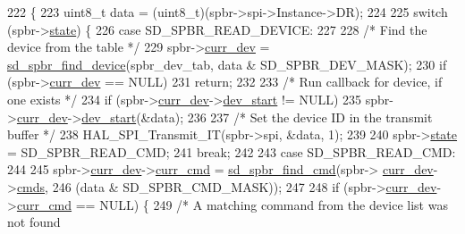 \begin{DoxyCode}
222 \{
223     uint8\_t data = (uint8\_t)(spbr->spi->Instance->DR);
224 
225     \textcolor{keywordflow}{switch} (spbr->\mbox{\hyperlink{structsd__spbr_a15ddc1ec640d62f5f08410710d83de8a}{state}}) \{
226     \textcolor{keywordflow}{case} SD\_SPBR\_READ\_DEVICE:
227     
228         \textcolor{comment}{/* Find the device from the table */}
229         spbr->\mbox{\hyperlink{structsd__spbr_ab3464a17b25faba49ad79ea9c48ea46f}{curr\_dev}} = \mbox{\hyperlink{group___s_d___s_p_i___bridge_gaf2de23902fa458c64da619f83a31d7ec}{sd\_spbr\_find\_device}}(spbr\_dev\_tab, data & 
      SD\_SPBR\_DEV\_MASK);
230         \textcolor{keywordflow}{if} (spbr->\mbox{\hyperlink{structsd__spbr_ab3464a17b25faba49ad79ea9c48ea46f}{curr\_dev}} == NULL)
231             \textcolor{keywordflow}{return};
232             
233         \textcolor{comment}{/* Run callback for device, if one exists */}
234         \textcolor{keywordflow}{if} (spbr->\mbox{\hyperlink{structsd__spbr_ab3464a17b25faba49ad79ea9c48ea46f}{curr\_dev}}->\mbox{\hyperlink{structsd__spbr__dev_a3e035473248af7cdffca805f540617c8}{dev\_start}} != NULL)
235             spbr->\mbox{\hyperlink{structsd__spbr_ab3464a17b25faba49ad79ea9c48ea46f}{curr\_dev}}->\mbox{\hyperlink{structsd__spbr__dev_a3e035473248af7cdffca805f540617c8}{dev\_start}}(&data);
236             
237         \textcolor{comment}{/* Set the device ID in the transmit buffer */}
238         HAL\_SPI\_Transmit\_IT(spbr->spi, &data, 1);
239         
240         spbr->\mbox{\hyperlink{structsd__spbr_a15ddc1ec640d62f5f08410710d83de8a}{state}} = SD\_SPBR\_READ\_CMD;
241         \textcolor{keywordflow}{break};
242     
243     \textcolor{keywordflow}{case} SD\_SPBR\_READ\_CMD:
244     
245         spbr->\mbox{\hyperlink{structsd__spbr_ab3464a17b25faba49ad79ea9c48ea46f}{curr\_dev}}->\mbox{\hyperlink{structsd__spbr__dev_a3217f31b08eb084b2c943abd2af5ca8b}{curr\_cmd}} = \mbox{\hyperlink{group___s_d___s_p_i___bridge_ga2b5f70f500fea4bd4b79b8788ba6e03d}{sd\_spbr\_find\_cmd}}(spbr->
      \mbox{\hyperlink{structsd__spbr_ab3464a17b25faba49ad79ea9c48ea46f}{curr\_dev}}->\mbox{\hyperlink{structsd__spbr__dev_acf35c83b2010d52c70fcc6b3db393bc6}{cmds}}, 
246                                 (data & SD\_SPBR\_CMD\_MASK));
247                                 
248         \textcolor{keywordflow}{if} (spbr->\mbox{\hyperlink{structsd__spbr_ab3464a17b25faba49ad79ea9c48ea46f}{curr\_dev}}->\mbox{\hyperlink{structsd__spbr__dev_a3217f31b08eb084b2c943abd2af5ca8b}{curr\_cmd}} == NULL) \{
249             \textcolor{comment}{/* A matching command from the device list was not found
}
\end{DoxyCode}
